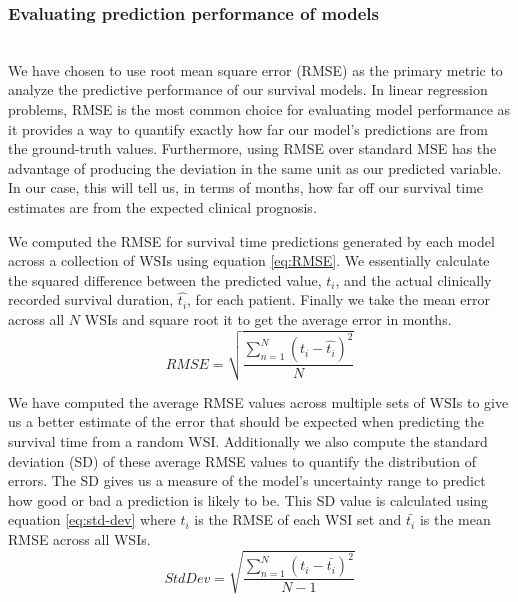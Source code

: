 \documentclass{l4proj}
\begin{document}
\subsubsection{Evaluating prediction performance of models}\hfill\\
We have chosen to use root mean square error (RMSE) as the primary metric to analyze the predictive performance of our survival models. In linear regression problems, RMSE is the most common choice for evaluating model performance as it provides a way to quantify exactly how far our model's predictions are from the ground-truth values. Furthermore, using RMSE over standard MSE has the advantage of producing the deviation in the same unit as our predicted variable. In our case, this will tell us, in terms of months, how far off our survival time estimates are from the expected clinical prognosis. 

We computed the RMSE for survival time predictions generated by each model across a collection of WSIs using equation \ref{eq:RMSE}. We essentially calculate the squared difference between the predicted value, \(t_{i}\), and the actual clinically recorded survival duration, \(\hat{t_{i}}\), for each patient. Finally we take the mean error across all \(N\) WSIs and square root it to get the average error in months. 
\begin{equation} \label{eq:RMSE}
    RMSE = \sqrt{\frac{\sum_{n=1}^{N} (t_{i} - \hat{t_{i}})^2}{N}}
\end{equation}

We have computed the average RMSE values across multiple sets of WSIs to give us a better estimate of the error that should be expected when predicting the survival time from a random WSI. Additionally we also compute the standard deviation (SD) of these average RMSE values to quantify the distribution of errors. The SD gives us a measure of the model's uncertainty range to predict how good or bad a prediction is likely to be. This SD value is calculated using equation \ref{eq:std-dev} where \(t_{i}\) is the RMSE of each WSI set and \(\bar{t_{i}}\) is the mean RMSE across all WSIs. 
\begin{equation} \label{eq:std-dev}
    StdDev = \sqrt{\frac{\sum_{n=1}^{N} (t_{i} - \bar{t_{i}})^2}{N-1}}
\end{equation}
\end{document}
